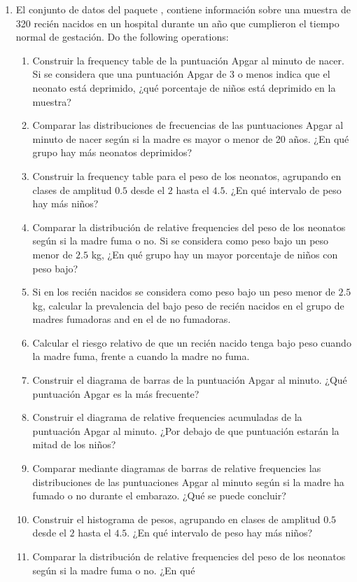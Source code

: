 \begin{enumerate}[leftmargin=*]
\item El conjunto de datos  del paquete , contiene información sobre una
muestra de 320 recién nacidos en un hospital durante un año que cumplieron el tiempo normal de gestación. 
Do the following operations:
\begin{enumerate}
\item Construir la frequency table de la puntuación Apgar al minuto de nacer. 
Si se considera que una puntuación Apgar de 3 o menos indica que el neonato está deprimido, ¿qué porcentaje de niños está deprimido en la muestra?
\item Comparar las distribuciones de frecuencias de las puntuaciones Apgar al minuto de nacer según si la madre es mayor
o menor de 20 años.
¿En qué grupo hay más neonatos deprimidos?
\item Construir la frequency table para el peso de los neonatos, agrupando en clases de amplitud $0.5$ desde el
$2$ hasta el $4.5$. ¿En qué intervalo de peso hay más niños?
\item Comparar la distribución de relative frequencies del peso de los neonatos según si la madre fuma o no. Si se
considera como peso bajo un peso menor de $2.5$ kg, ¿En qué grupo hay un mayor porcentaje de niños con peso bajo?
\item Si en los recién nacidos se considera como peso bajo un peso menor de $2.5$ kg, calcular la prevalencia del bajo
peso de recién nacidos en el grupo de madres fumadoras and en el de no fumadoras. 
\item Calcular el riesgo relativo de que un recién nacido tenga bajo peso cuando la madre fuma, frente a cuando la madre
no fuma. 
\item Construir el diagrama de barras de la puntuación Apgar al minuto. ¿Qué puntuación Apgar es la más frecuente? 
\item Construir el diagrama de relative frequencies acumuladas de la puntuación Apgar al minuto. ¿Por debajo de que puntuación estarán la mitad de los niños?
\item Comparar mediante diagramas de barras de relative frequencies las distribuciones de las puntuaciones Apgar al
minuto según si la madre ha fumado o no durante el embarazo. ¿Qué se puede concluir?
\item Construir el histograma de pesos, agrupando en clases de amplitud $0.5$ desde el $2$ hasta el $4.5$. ¿En qué
intervalo de peso hay más niños?
\item Comparar la distribución de relative frequencies del peso de los neonatos según si la madre fuma o no. ¿En qué

\end{enumerate}
\end{enumerate}
